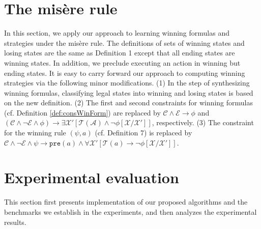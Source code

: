 \documentclass[review]{elsarticle}
\newcommand{\statevar}{\mathcal{X}}
\newcommand{\act}{\mathcal{A}}
\newcommand{\trans}{\mathcal{T}}
\newcommand{\constraint}{\mathcal{C}}
\newcommand{\estate}{\mathcal{E}}
\newcommand{\pre}{\mathtt{pre}}
\newtheorem{theorem}{Theorem}
\begin{document}
\section{The mis\`{e}re rule} \label{sec:misere}
	In this section, we apply our approach to learning winning formulas and strategies under the mis\`{e}re rule. The definitions of sets of winning states and losing states are the same as Definition 1 except that all ending states are winning states.
	In addition, we preclude executing an action in winning but ending states.
	It is easy to carry forward our approach to computing winning strategies via the following minor modifications.
	(1) In the step of synthesizing winning formulas, classifying legal states into winning and losing states is based on the new definition.
	(2) The first and second constraints for winning formulas (cf. Definition \ref{def:consWinForm}) are replaced by $\constraint \land \estate \rightarrow \phi$ and $(\constraint \land \neg \estate \land \phi) \rightarrow \exists \statevar' [\trans(\act) \land \neg \phi[\statevar/\statevar']]$, respectively. 
	(3) The constraint for the winning rule $(\psi, a)$ (cf. Definition 7) is replaced by $\constraint \land \neg \estate \land \psi \rightarrow  \pre(a)  \land \forall \statevar' [\trans(a) \rightarrow \neg \phi[\statevar/\statevar']]$.
	
	

	
	


	

	
\section{Experimental evaluation}
This section first presents implementation of our proposed algorithms and the benchmarks we establish in the experiments, and then analyzes the experimental results. 
\end{document}

